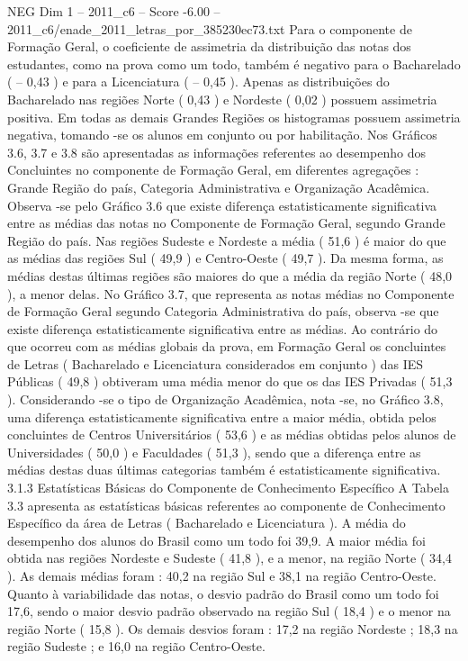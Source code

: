 \begin{textsample}{NEG Dim 1 – 2011\_c6 – Score -6.00 – 2011\_c6/enade\_2011\_letras\_por\_385230ec73.txt}
Para o componente de Formação Geral, o coeficiente de assimetria da distribuição das notas dos estudantes, como na prova como um todo, também é negativo para o Bacharelado ( – 0,43 ) e para a Licenciatura ( – 0,45 ).
Apenas as distribuições do Bacharelado nas regiões Norte ( 0,43 ) e Nordeste ( 0,02 ) possuem assimetria positiva.
Em todas as demais Grandes Regiões os histogramas possuem assimetria negativa, tomando -se os alunos em conjunto ou por habilitação.
Nos Gráficos 3.6, 3.7 e 3.8 são apresentadas as informações referentes ao desempenho dos Concluintes no componente de Formação Geral, em diferentes agregações : Grande Região do país, Categoria Administrativa e Organização Acadêmica.
Observa -se pelo Gráfico 3.6 que existe diferença estatisticamente significativa entre as médias das notas no Componente de Formação Geral, segundo Grande Região do país.
Nas regiões Sudeste e Nordeste a média ( 51,6 ) é maior do que as médias das regiões Sul ( 49,9 ) e Centro-Oeste ( 49,7 ).
Da mesma forma, as médias destas últimas regiões são maiores do que a média da região Norte ( 48,0 ), a menor delas.
No Gráfico 3.7, que representa as notas médias no Componente de Formação Geral segundo Categoria Administrativa do país, observa -se que existe diferença estatisticamente significativa entre as médias.
Ao contrário do que ocorreu com as médias globais da prova, em Formação Geral os concluintes de Letras ( Bacharelado e Licenciatura considerados em conjunto ) das IES Públicas ( 49,8 ) obtiveram uma média menor do que os das IES Privadas ( 51,3 ).
Considerando -se o tipo de Organização Acadêmica, nota -se, no Gráfico 3.8, uma diferença estatisticamente significativa entre a maior média, obtida pelos concluintes de Centros Universitários ( 53,6 ) e as médias obtidas pelos alunos de Universidades ( 50,0 ) e Faculdades ( 51,3 ), sendo que a diferença entre as médias destas duas últimas categorias também é estatisticamente significativa. 3.1.3 Estatísticas Básicas do Componente de Conhecimento Específico A Tabela 3.3 apresenta as estatísticas básicas referentes ao componente de Conhecimento Específico da área de Letras ( Bacharelado e Licenciatura ).
A média do desempenho dos alunos do Brasil como um todo foi 39,9.
A maior média foi obtida nas regiões Nordeste e Sudeste ( 41,8 ), e a menor, na região Norte ( 34,4 ).
As demais médias foram : 40,2 na região Sul e 38,1 na região Centro-Oeste.
Quanto à variabilidade das notas, o desvio padrão do Brasil como um todo foi 17,6, sendo o maior desvio padrão observado na região Sul ( 18,4 ) e o menor na região Norte ( 15,8 ).
Os demais desvios foram : 17,2 na região Nordeste ; 18,3 na região Sudeste ; e 16,0 na região Centro-Oeste.

\end{textsample}
